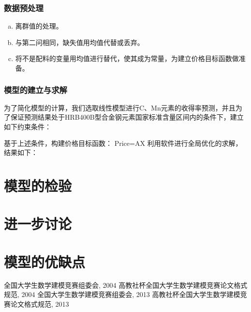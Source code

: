 \documentclass{xcumcmart}
\begin{document}
\subsubsection{数据预处理}
\begin{enumerate}[(a)]
\setlength{\itemindent}{2em}    %
\item 离群值的处理。
\item 与第二问相同，缺失值用均值代替或丢弃。
\item 将不是配料的变量用均值进行替代，使其成为常量，为建立价格目标函数做准备。
\end{enumerate}

\subsubsection{模型的建立与求解}
为了简化模型的计算，我们选取线性模型进行C、Mn元素的收得率预测，并且为了保证预测结果处于HRB400B型合金钢元素国家标准含量区间内的条件下，建立如下约束条件：

基于上述条件，构建价格目标函数：
Price=AX
利用软件进行全局优化的求解，结果如下：



\section{模型的检验}
\section{进一步讨论}
\section{模型的优缺点}

\begin{thebibliography}{1}
 全国大学生数学建模竞赛组委会, 2004 高教社杯全国大学生数学建模竞赛论文格式规范, 2004
 全国大学生数学建模竞赛组委会, 2013 高教社杯全国大学生数学建模竞赛论文格式规范, 2013
\end{thebibliography}
\end{document}
